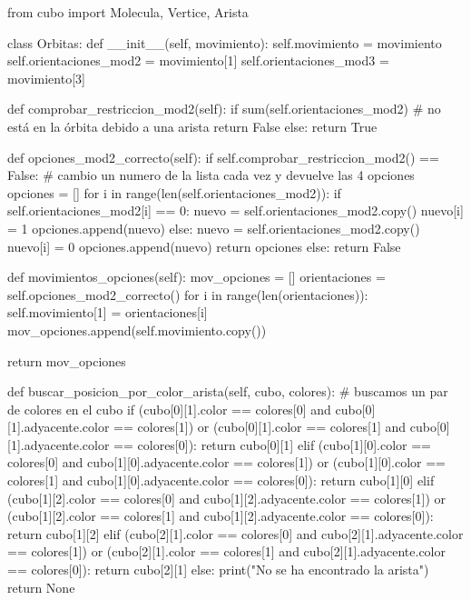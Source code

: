 
from cubo import Molecula, Vertice, Arista

class Orbitas:
    def __init__(self, movimiento):
        self.movimiento = movimiento
        self.orientaciones_mod2 = movimiento[1]
        self.orientaciones_mod3 = movimiento[3]

    def comprobar_restriccion_mod2(self):
        if sum(self.orientaciones_mod2) %
            # no está en la órbita debido a una arista
            return False
        else:
            return True

    def opciones_mod2_correcto(self):
        if self.comprobar_restriccion_mod2() == False:
            # cambio un numero de la lista cada vez y devuelve las 4 opciones
            opciones = []
            for i in range(len(self.orientaciones_mod2)):
                if self.orientaciones_mod2[i] == 0:
                    nuevo = self.orientaciones_mod2.copy()
                    nuevo[i] = 1
                    opciones.append(nuevo)
                else:
                    nuevo = self.orientaciones_mod2.copy()
                    nuevo[i] = 0
                    opciones.append(nuevo)
            return opciones
        else:
            return False

    def movimientos_opciones(self):
        mov_opciones = []
        orientaciones = self.opciones_mod2_correcto()
        for i in range(len(orientaciones)):
            self.movimiento[1] = orientaciones[i]
            mov_opciones.append(self.movimiento.copy())            

        return mov_opciones
    
    def buscar_posicion_por_color_arista(self, cubo, colores):
        # buscamos un par de colores en el cubo
        if (cubo[0][1].color == colores[0] and cubo[0][1].adyacente.color == colores[1]) or (cubo[0][1].color == colores[1] and cubo[0][1].adyacente.color == colores[0]):
            return cubo[0][1]
        elif (cubo[1][0].color == colores[0] and cubo[1][0].adyacente.color == colores[1]) or (cubo[1][0].color == colores[1] and cubo[1][0].adyacente.color == colores[0]): 
            return cubo[1][0]
        elif (cubo[1][2].color == colores[0] and cubo[1][2].adyacente.color == colores[1]) or (cubo[1][2].color == colores[1] and cubo[1][2].adyacente.color == colores[0]):
            return cubo[1][2]
        elif (cubo[2][1].color == colores[0] and cubo[2][1].adyacente.color == colores[1]) or (cubo[2][1].color == colores[1] and cubo[2][1].adyacente.color == colores[0]):
            return cubo[2][1]
        else:
            print("No se ha encontrado la arista")
            return None
        
